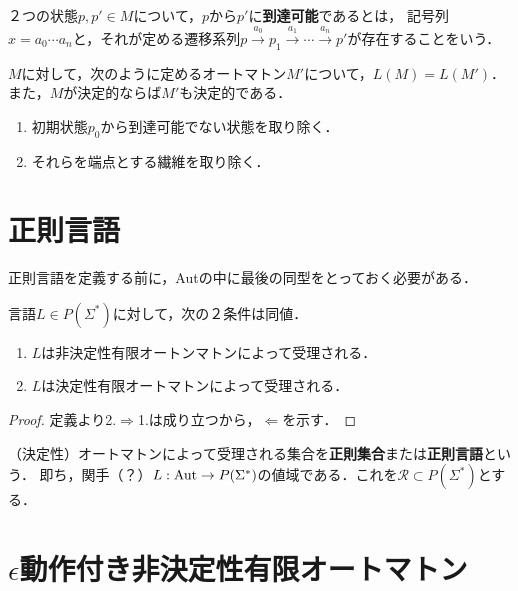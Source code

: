\documentclass[uplatex, 12pt, dvipdfmx]{jsreport}
\begin{document}
\begin{definition}[accessible]
    ２つの状態$p,p'\in M$について，$p$から$p'$に\textbf{到達可能}であるとは，
    記号列$x=a_0\cdots a_n$と，それが定める遷移系列$p\xrightarrow{a_0}p_1\xrightarrow{a_1}\cdots\xrightarrow{a_n}p'$が存在することをいう．
\end{definition}

\begin{proposition}[有限オートマトンの射]
    $M$に対して，次のように定めるオートマトン$M'$について，$L(M)=L(M')$．
    また，$M$が決定的ならば$M'$も決定的である．
    \begin{enumerate}
        \item 初期状態$p_0$から到達可能でない状態を取り除く．
        \item それらを端点とする繊維を取り除く．
    \end{enumerate}
\end{proposition}

\section{正則言語}

正則言語を定義する前に，Autの中に最後の同型をとっておく必要がある．

\begin{theorem}[非決定性有限オートマトンと決定性有限オートマトンの等価性]
    言語$L\in P(\Sigma^*)$に対して，次の２条件は同値．
    \begin{enumerate}
        \item $L$は非決定性有限オートンマトンによって受理される．
        \item $L$は決定性有限オートマトンによって受理される．
    \end{enumerate}
\end{theorem}
\begin{proof}
    定義より2.$\Rightarrow$1.は成り立つから，$\Leftarrow$を示す．
\end{proof}

\begin{definition}
    （決定性）オートマトンによって受理される集合を\textbf{正則集合}または\textbf{正則言語}という．
    即ち，関手（？）$L:\mathrm{Aut}\to P(\Sigma^*)$の値域である．これを$\mathcal{R}\subset P(\Sigma^*)$とする．
\end{definition}

\section{$\epsilon$動作付き非決定性有限オートマトン}
\end{document}
